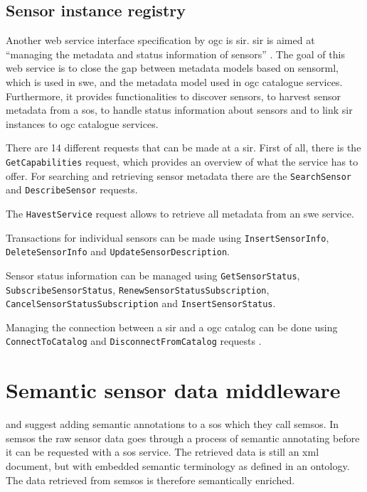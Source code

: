 \subsection{Sensor instance registry}
Another web service interface specification by \ac{ogc} is \ac{sir}. \ac{sir} is aimed at \enquote{managing the metadata and status information of sensors} \cite[p. xii]{SW:OGC3}. The goal of this web service is to close the gap between metadata models based on \ac{sensorml}, which is used in \ac{swe}, and the metadata model used in \ac{ogc} catalogue services. Furthermore, it provides functionalities to discover sensors, to harvest sensor metadata from a \ac{sos}, to handle status information about sensors and to link \ac{sir} instances to \ac{ogc} catalogue services. 

\begin{sloppypar}
There are 14 different requests that can be made at a \ac{sir}. First of all, there is the \texttt{GetCapabilities} request, which provides an overview of what the service has to offer. For searching and retrieving sensor metadata there are the \texttt{SearchSensor} and \texttt{DescribeSensor} requests. 

The \texttt{HavestService} request allows to retrieve all metadata from an \ac{swe} service. 

Transactions for individual sensors can be made using \texttt{InsertSensorInfo}, \texttt{DeleteSensorInfo}  and \texttt{UpdateSensorDescription}. 

Sensor status information can be managed using \texttt{GetSensorStatus}, \texttt{SubscribeSensorStatus}, \texttt{RenewSensorStatusSubscription}, \texttt{CancelSensorStatusSubscription} and \texttt{InsertSensorStatus}. 

Managing the connection between a \ac{sir} and a \ac{ogc} catalog can be done using \texttt{ConnectToCatalog} and \texttt{DisconnectFromCatalog} requests \citep{SW:OGC3}.
\end{sloppypar}

\section{Semantic sensor data middleware}
\cite{SSW:Henson} and \cite{SSW:Pschorr} suggest adding semantic annotations to a \ac{sos} which they call \ac{semsos}. In \ac{semsos} the raw sensor data goes through a process of semantic annotating before it can be requested with a \ac{sos} service. The retrieved data is still an \ac{xml} document, but with embedded semantic terminology as defined in an ontology. The data retrieved from \ac{semsos} is therefore semantically enriched.  

